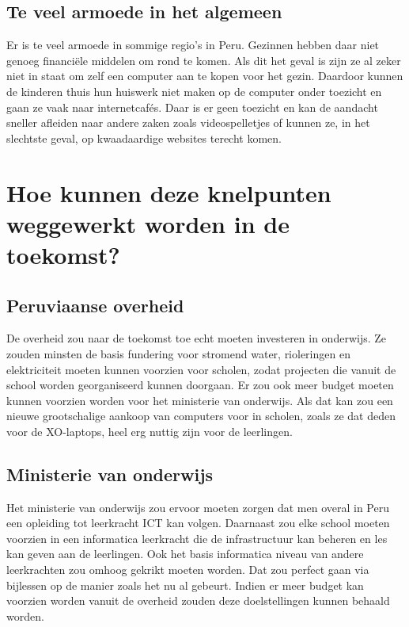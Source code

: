 \subsection{Te veel armoede in het algemeen}
Er is te veel armoede in sommige regio's in Peru. Gezinnen hebben daar niet genoeg financiële middelen om rond te komen. Als dit het geval is zijn ze al zeker niet in staat om zelf een computer aan te kopen voor het gezin. Daardoor kunnen de kinderen thuis hun huiswerk niet maken op de computer onder toezicht en gaan ze vaak naar internetcafés. Daar is er geen toezicht en kan de aandacht sneller afleiden naar andere zaken zoals videospelletjes of kunnen ze, in het slechtste geval, op kwaadaardige websites terecht komen.

\section{Hoe kunnen deze knelpunten weggewerkt worden in de toekomst?}

\subsection{Peruviaanse overheid}
De overheid zou naar de toekomst toe echt moeten investeren in onderwijs. Ze zouden minsten de basis fundering voor stromend water, rioleringen en elektriciteit moeten kunnen voorzien voor scholen, zodat projecten die vanuit de school worden georganiseerd kunnen doorgaan. Er zou ook meer budget moeten kunnen voorzien worden voor het ministerie van onderwijs. Als dat kan zou een nieuwe grootschalige aankoop van computers voor in scholen, zoals ze dat deden voor de XO-laptops, heel erg nuttig zijn voor de leerlingen. 

\subsection{Ministerie van onderwijs}
Het ministerie van onderwijs zou ervoor moeten zorgen dat men overal in Peru een opleiding tot leerkracht ICT kan volgen. Daarnaast zou elke school moeten voorzien in een informatica leerkracht die de infrastructuur kan beheren en les kan geven aan de leerlingen. Ook het basis informatica niveau van andere leerkrachten zou omhoog gekrikt moeten worden. Dat zou perfect gaan via bijlessen op de manier zoals het nu al gebeurt. Indien er meer budget kan voorzien worden vanuit de overheid zouden deze doelstellingen kunnen behaald worden.

